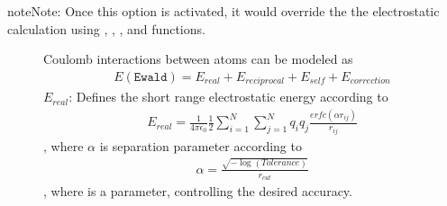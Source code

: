 \documentclass[letterpaper,10pt,english]{sphinxmanual}
\begin{document}
\begin{sphinxadmonition}{note}{Note:}
\sphinxAtStartPar
Once this option is activated, it would override the the electrostatic calculation using , , , and  functions.
\end{sphinxadmonition}
\begin{description}
\item[{}] \leavevmode
\sphinxAtStartPar
Coulomb interactions between atoms can be modeled as
\begin{equation*}
\begin{split}E(\texttt{Ewald}) = E_{real} + E_{reciprocal} + E_{self} + E_{correction}\end{split}
\end{equation*}
\sphinxAtStartPar
\(E_{real}\): Defines the short range electrostatic energy according to
\begin{equation*}
\begin{split}E_{real} = \frac{1}{4\pi \epsilon_0} \frac{1}{2} \sum_{i =1}^{N} \sum_{j = 1}^{N} q_i q_j  \frac{erfc(\alpha r_{ij})}{r_{ij}}\end{split}
\end{equation*}
\sphinxAtStartPar
, where \(\alpha\) is  separation parameter according to
\begin{equation*}
\begin{split}\alpha = \frac {\sqrt{-\log (Tolerance)}}{r_{cut}}\end{split}
\end{equation*}
\sphinxAtStartPar
, where  is a parameter, controlling the desired accuracy.


\end{description}
\end{document}
